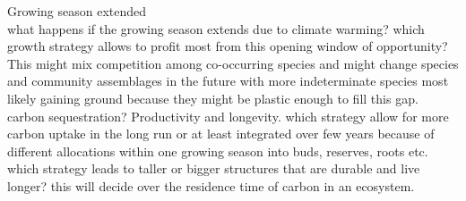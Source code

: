 \documentclass{article}
\begin{document}
Growing season extended\\
what happens if the growing season extends due to climate warming? which growth strategy allows to profit most from this opening window of opportunity? This might mix competition among co-occurring species and might change species and community assemblages in the future with more indeterminate species most likely gaining ground because they might be plastic enough to fill this gap. \\
carbon sequestration? Productivity and longevity. which strategy allow for more carbon uptake in the long run or at least integrated over few years because of different allocations within one growing season into buds, reserves, roots etc.
which strategy leads to taller or bigger structures that are durable and live longer? this will decide over the residence time of carbon in an ecosystem.
\\
\end{document}
